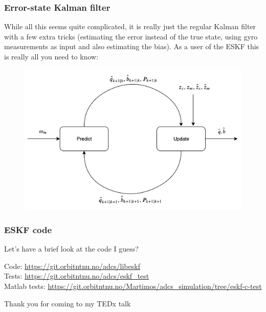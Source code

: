 \documentclass{beamer}
\begin{document}
\begin{frame}
    \frametitle{Error-state Kalman filter}
    While all this seems quite complicated, it is really just the regular Kalman filter with a few extra tricks (estimating the error instead of the true state, using gyro measurements as input and also estimating the bias). As a user of the ESKF this is really all you need to know:
    \begin{figure}
        \includegraphics[width=0.7\linewidth]{ESKF.png}
    \end{figure}
\end{frame}


\begin{frame}
    \frametitle{ESKF code}
    \large{\centerline{Let's have a brief look at the code I guess?}}
   \begin{center}
    \small{Code: \url{https://git.orbitntnu.no/adcs/libeskf} \\
    Tests: \url{https://git.orbitntnu.no/adcs/eskf_test} \\
    Matlab tests: \url{https://git.orbitntnu.no/Martimos/adcs_simulation/tree/eskf-c-test}}
   \end{center}
\end{frame}


\begin{frame}
\huge{\centerline{Thank you for coming to my TEDx talk}}
\end{frame}

\end{document}
